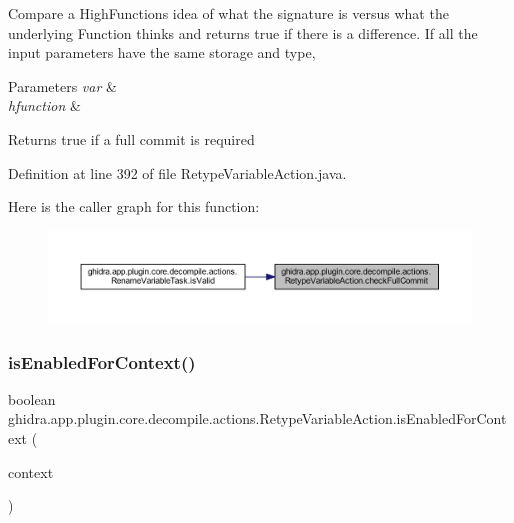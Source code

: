 Compare a High\+Function\textquotesingle{}s idea of what the signature is versus what the underlying Function thinks and returns true if there is a difference. If all the input parameters have the same storage and type, 
\begin{DoxyParams}{Parameters}
{\em var} & \\
\hline
{\em hfunction} & \\
\hline
\end{DoxyParams}
\begin{DoxyReturn}{Returns}
true if a full commit is required 
\end{DoxyReturn}


Definition at line 392 of file Retype\+Variable\+Action.\+java.

Here is the caller graph for this function\+:
\nopagebreak
\begin{figure}[H]
\begin{center}
\leavevmode
\includegraphics[width=350pt]{classghidra_1_1app_1_1plugin_1_1core_1_1decompile_1_1actions_1_1_retype_variable_action_a72953b7e56191b41bfbaae3e2ec00657_icgraph}
\end{center}
\end{figure}
\mbox{\label{classghidra_1_1app_1_1plugin_1_1core_1_1decompile_1_1actions_1_1_retype_variable_action_a8146e16bb37975dc024530409532dba1}} 
\subsubsection{\texorpdfstring{isEnabledForContext()}{isEnabledForContext()}}
{\footnotesize\ttfamily boolean ghidra.\+app.\+plugin.\+core.\+decompile.\+actions.\+Retype\+Variable\+Action.\+is\+Enabled\+For\+Context (\begin{DoxyParamCaption}\item[{Action\+Context}]{context }\end{DoxyParamCaption})\hspace{0.3cm}{\ttfamily [inline]}}



